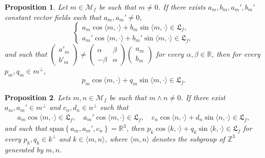 \documentclass[10pt,a4paper]{amsart}
\newtheorem{prop}{Proposition}
\newcommand{\M}{{\mathcal M}}
\newcommand{\R}{{\mathbb R}}
\newcommand{\Z}{{\mathbb Z}}
\newcommand{\la}{\langle}
\newcommand{\ra}{\rangle}
\newcommand{\we}{\wedge}
\begin{document}
\begin{prop} \label{adding modes : different angles}
    Let $m\in \M_f$ be such that $m\neq 0$. If there exists $a_m,b_m,a_m',b_m'$ constant vector fields such that $a_m,a_m'\neq 0$,
    \begin{equation*}
        \left\{\begin{array}{cc}
           a_m\cos \la m,\cdot\ra+b_m \sin \la m,\cdot \ra \in \mathfrak{L}_f,    \\
        a_m'\cos\la m,\cdot \ra+b_m'\sin \la m,\cdot \ra\in \mathfrak{L}_f,
        \end{array}\right.
    \end{equation*}
    and such that $\begin{pmatrix}
            a'_m \\
            b'_m
        \end{pmatrix}\neq \begin{pmatrix}
            \alpha & \beta\\
            -\beta & \alpha 
        \end{pmatrix}\begin{pmatrix}
            a_m\\
            b_m
        \end{pmatrix}$ for every $\alpha,\beta\in \R$, then for every $p_m,q_m\in m^{\perp}$,
    \begin{equation*}
        p_m\cos \la m,\cdot \ra + q_m \sin \la m,\cdot \ra \in \mathfrak{L}_f.
    \end{equation*}
\end{prop}

\begin{prop} \label{generation of modes : from 2 non colinear modes}
    Lets $m,n\in \M_f$ be such that $m\we n \neq 0$. If there exist $a_m,a_m'\in m^{\perp}$ and $c_n,d_n \in n^{\perp}$ such that 
    \begin{align*}
        a_m\cos \la m,\cdot \ra \in \mathfrak{L}_f, \quad a_m'\cos \la m,\cdot \ra \in \mathfrak{L}_f, \quad
        c_n \cos \la n,\cdot \ra +d_n \sin \la n,\cdot \ra \in \mathfrak{L}_f,
    \end{align*}
    and such that $\mathrm{span}\left\{a_m,a_m',c_n\right\}=\R^3$, then $p_k\cos\la k,\cdot \ra + q_k\sin \la k,\cdot \ra \in \mathfrak{L}_f$ for every $p_k,q_k \in k^{\perp}$ and $k \in \la m,n\ra$, where $\la m,n\ra$ denotes the subgroup of $\Z^3$ generated by $m,n$.
\end{prop}
\end{document}
